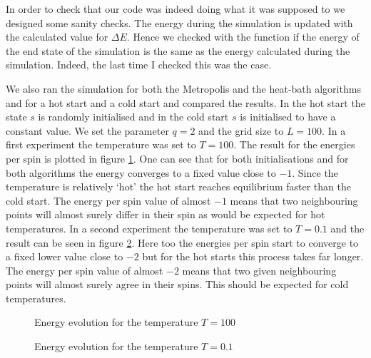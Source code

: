 In order to check that our code was indeed doing what it was supposed to we designed some sanity checks. 
The energy during the simulation is updated with the calculated value for $\Delta E$.
Hence we checked with the function  if the energy of the end state of the simulation is the same as the energy calculated during the simulation. Indeed, the last time I checked this was the case.

We also ran the simulation for both the Metropolis and the heat-bath algorithms and for a hot start and a cold start and compared the results. In the hot start the state $s$ is randomly initialised and in the cold start $s$ is initialised to have a constant value. We set the parameter $q=2$ and the grid size to $L=100$. In a first experiment the temperature was set to $T=100$. The result for the energies per spin is plotted in figure \ref{pl:HC_test_warm}. One can see that for both initialisations and for both algorithms the energy converges to a fixed value close to $-1$. Since the temperature is relatively `hot' the hot start reaches equilibrium faster than the cold start. The energy per spin value of almost $-1$ means that two neighbouring points will almost surely differ in their spin as would be expected for hot temperatures.
In a second experiment the temperature was set to $T=0.1$ and the result can be seen in figure \ref{pl:HC_test_cold}. Here too the energies per spin start to converge to a fixed lower value close to $-2$ but for the hot starts this process takes far longer. The energy per spin value of almost $-2$ means that two given neighbouring points will almost surely agree in their spins. This should be expected for cold temperatures.


\begin{figure}
\centering
\begin{minipage}{0.7\textwidth}
\centering
\graphicspath{{../../Plots/}}

\caption{Energy evolution for the temperature $T=100$}
\label{pl:HC_test_warm}
\end{minipage}
\end{figure}

\begin{figure}
\centering
\begin{minipage}{0.7\textwidth}
\centering
\graphicspath{{../../Plots/}}

\caption{Energy evolution for the temperature $T=0.1$}
\label{pl:HC_test_cold}
\end{minipage}
\end{figure}

